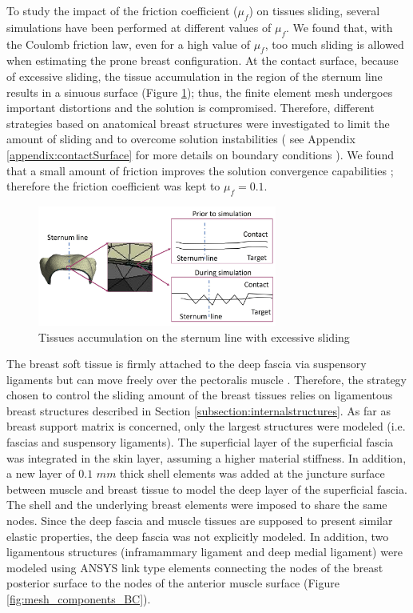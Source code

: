 To study the impact of the friction coefficient ($\mu_f$) on tissues sliding, several simulations have been performed at different values of $\mu_f$. We found that, with the Coulomb friction law, even for a high value of $\mu_f$, too much sliding is allowed when estimating the prone breast configuration. At the contact surface, because of excessive sliding, the tissue accumulation in the region of the sternum line results in a sinuous surface (Figure \ref{fig:overslidingProblem}); thus, the finite element mesh  undergoes important distortions and the solution is compromised. Therefore, different strategies based on anatomical breast structures were investigated to limit the amount of sliding and to overcome solution instabilities ( see Appendix \ref{appendix:contactSurface} for more details on boundary conditions ). We found that a small amount of friction improves the solution convergence capabilities \citep{ansys_contact_2017}; therefore the friction coefficient was kept to $\mu_f = 0.1$. 
\begin{figure}[!h]
\centering
\includegraphics[width=0.7\textwidth,keepaspectratio]{figures/overslidingProblem.jpg} 
\caption{Tissues accumulation on the sternum line with excessive sliding}\label{fig:overslidingProblem}
\end{figure}
 
The breast soft tissue is firmly attached to the deep fascia via suspensory ligaments but can move freely over the pectoralis muscle  \citep{mugea2014aesthetic,clemente2011anatomy}. Therefore, the strategy chosen to control the sliding amount of the breast tissues relies on ligamentous breast structures described in Section \ref{subsection:internalstructures}. As far as  breast support matrix is concerned, only the largest structures were modeled (i.e. fascias and suspensory ligaments).  The superficial layer of the superficial fascia was integrated in the skin layer, assuming a higher material stiffness. In addition, a new layer of $0.1$ $mm$ thick shell elements was added at the juncture surface between muscle and breast tissue to model the deep layer of the superficial fascia. The shell and the underlying breast elements were imposed to share the same nodes. Since the deep fascia and muscle tissues are supposed to present similar elastic properties, the deep fascia was not explicitly modeled. In addition, two ligamentous structures (inframammary ligament and deep medial ligament) were modeled using ANSYS link type elements connecting the nodes of the breast posterior surface to the nodes of the anterior muscle surface (Figure \ref{fig:mesh_components_BC}).  


